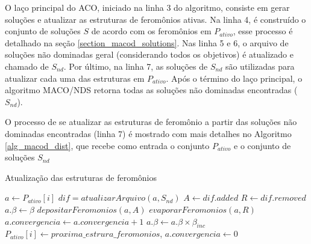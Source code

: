 O laço principal do ACO, iniciado na linha 3 do algoritmo, consiste em gerar soluções e atualizar as estruturas de feromônios ativas. Na linha 4, é construído o conjunto de soluções $S$ de acordo com os feromônios em $P_{ativo}$, esse processo é detalhado na seção \ref{section_macod_solutions}. Nas linha 5 e 6, o arquivo de soluções não dominadas geral (considerando todos os objetivos) é atualizado e chamado de $S_{nd}$. Por último, na linha 7, as soluções de $S_{nd}$ são utilizadas para atualizar cada uma das estruturas em $P_{ativo}$. Após o término do laço principal, o algoritmo MACO/NDS retorna todas as soluções não dominadas encontradas ($S_{nd}$).

O processo de se atualizar as estruturas de feromônio a partir das soluções não dominadas encontradas (linha 7) é mostrado com mais detalhes no Algoritmo \ref{alg_macod_dist}, que recebe como entrada o conjunto $P_{ativo}$ e o conjunto de soluções $S_{nd}$

\begin{algorithm}[!htbp]
	\caption{Atualização das estruturas de feromônios}
	\label{alg_macod_dist}
	\begin{algorithmic}[1]
		\State $a \gets P_{ativo}[i]$
		\State $dif = atualizarArquivo(a, S_{nd})$
		\State $A \gets dif.added$
		\State $R \gets dif.removed$
		\State $a.\beta \gets \beta$
		\State $depositarFeromonios(a, A)$
		\State $evaporarFeromonios(a, R)$
		\Else
		\State $a.convergencia \gets a.convergencia + 1$
		\State $a.\beta \gets a.\beta \times \beta_{inc}$
		\State $P_{ativo}[i] \gets proxima\_estrura\_feromonios$,
		\State $a.convergencia \gets 0$
		\EndIf
		\EndIf
		\EndFor
	\end{algorithmic}
\end{algorithm}

